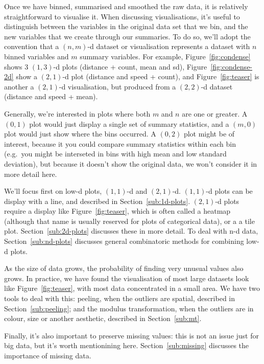 \documentclass[journal]{vgtc}                %
\begin{document}
Once we have binned, summarised and smoothed the raw data, it is relatively straightforward to visualise it. When discussing visualisations, it's useful to distinguish between the variables in the original data set that we bin, and the new variables that we create through our summaries. To do so, we'll adopt the convention that a $(n, m)$-d dataset or visualisation represents a dataset with $n$ binned variables and $m$ summary variables. For example, Figure~\ref{fig:condense} shows 3 $(1, 3)$-d plots (distance + count, mean and sd), Figure~\ref{fig:condense-2d} show a $(2, 1)$-d plot (distance and speed + count), and Figure~\ref{fig:teaser} is another a $(2, 1)$-d visualisation, but produced from a $(2, 2)$-d dataset (distance and speed + mean).

Generally, we're interested in plots where both $m$ and $n$ are one or greater. A $(0, 1)$ plot would just display a single set of summary statistics, and a $(m, 0)$ plot would just show where the bins occurred. A $(0, 2)$ plot might be of interest, because it you could compare summary statistics within each bin (e.g.\ you might be interseted in bins with high mean and low standard deviation), but because it doesn't show the original data, we won't consider it in more detail here. 

We'll focus first on low-d plots, $(1, 1)$-d and $(2, 1)$-d. $(1, 1)$-d plots can be display with a line, and described in Section~\ref{sub:1d-plots}. $(2, 1)$-d plots require a display like Figure~\ref{fig:teaser}, which is often called a heatmap \citep{wilkinson:2009} (although that name is usually reserved for plots of categorical data), or a a tile plot. Section~\ref{sub:2d-plots} discusses these in more detail. To deal with n-d data, Section~\ref{sub:nd-plots} discusses general combinatoric methods for combining low-d plots.

As the size of data grows, the probability of finding very unusual values also grows. In practice, we have found the visualisation of most large datasets look like Figure~\ref{fig:teaser}, with most data concentrated in a small area. We have two tools to deal with this: peeling, when the outliers are spatial, described in Section~\ref{sub:peeling}; and the modulus transformation, when the outliers are in colour, size or another aesthetic, described in Section~\ref{sub:mt}.

Finally, it's also important to preserve missing values: this is not an issue just for big data, but it's worth mentionining here. Section~\ref{sub:missing} discusses the importance of missing data.
\end{document}
